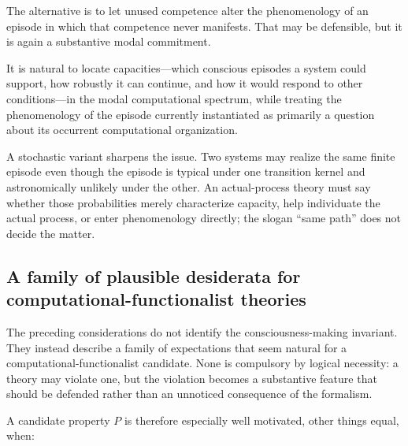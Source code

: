 \documentclass[11pt,a4paper]{article}
\begin{document}
The alternative is to let unused competence alter the phenomenology of an episode in which that competence never manifests. That may be defensible, but it is again a substantive modal commitment.

\begin{principlebox}[title={Capacity--Occurrence Separation: a plausible distinction}]
It is natural to locate capacities---which conscious episodes a system could support, how robustly it can continue, and how it would respond to other conditions---in the modal computational spectrum, while treating the phenomenology of the episode currently instantiated as primarily a question about its occurrent computational organization.
\end{principlebox}

A stochastic variant sharpens the issue. Two systems may realize the same finite episode even though the episode is typical under one transition kernel and astronomically unlikely under the other. An actual-process theory must say whether those probabilities merely characterize capacity, help individuate the actual process, or enter phenomenology directly; the slogan ``same path'' does not decide the matter.

\subsection{A family of plausible desiderata for computational-functionalist theories}

The preceding considerations do not identify the consciousness-making invariant. They instead describe a family of expectations that seem natural for a computational-functionalist candidate. None is compulsory by logical necessity: a theory may violate one, but the violation becomes a substantive feature that should be defended rather than an unnoticed consequence of the formalism.

A candidate property $P$ is therefore especially well motivated, other things equal, when:
\end{document}

